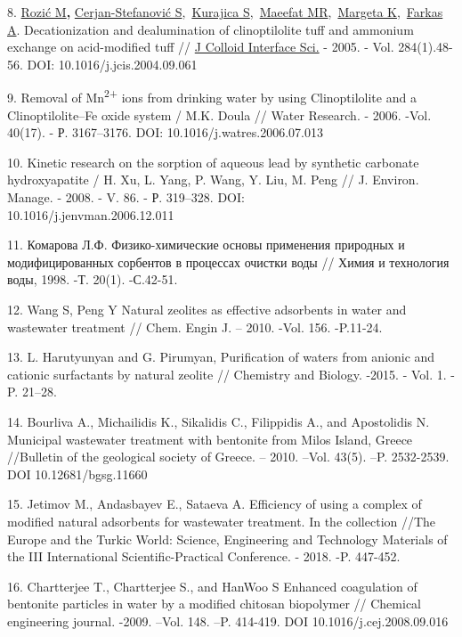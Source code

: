 \begin{references}
8.
\href{https://www.ncbi.nlm.nih.gov/pubmed/?term=Rozi\%C4\%87\%20M\%5BAuthor\%5D&cauthor=true&cauthor_uid=15752783}{Rozić
M}{\bfseries ,}
\href{https://www.ncbi.nlm.nih.gov/pubmed/?term=Cerjan-Stefanovi\%C4\%87\%20S\%5BAuthor\%5D&cauthor=true&cauthor_uid=15752783}{Cerjan-Stefanović
S},~\href{https://www.ncbi.nlm.nih.gov/pubmed/?term=Kurajica\%20S\%5BAuthor\%5D&cauthor=true&cauthor_uid=15752783}{Kurajica
S},~\href{https://www.ncbi.nlm.nih.gov/pubmed/?term=Maeefat\%20MR\%5BAuthor\%5D&cauthor=true&cauthor_uid=15752783}{Maeefat
MR},~\href{https://www.ncbi.nlm.nih.gov/pubmed/?term=Margeta\%20K\%5BAuthor\%5D&cauthor=true&cauthor_uid=15752783}{Margeta
K},~\href{https://www.ncbi.nlm.nih.gov/pubmed/?term=Farkas\%20A\%5BAuthor\%5D&cauthor=true&cauthor_uid=15752783}{Farkas
A}. Decationization and dealumination of clinoptilolite tuff and
ammonium exchange on acid-modified tuff //
\href{https://www.ncbi.nlm.nih.gov/pubmed/15752783}{J Colloid Interface
Sci.} - 2005. - Vol. 284(1).48-56. DOI: 10.1016/j.jcis.2004.09.061

9. Removal of Mn\textsuperscript{2+} ions from drinking water by using
Clinoptilolite and a Clinoptilolite--Fe oxide system / M.K. Doula //
Water Research. - 2006. -Vol. 40(17). - Р. 3167--3176. DOI:
10.1016/j.watres.2006.07.013

10. Kinetic research on the sorption of aqueous lead by synthetic
carbonate hydroxyapatite / H. Xu, L. Yang, P. Wang, Y. Liu, M. Peng //
J. Environ. Manage. - 2008. - V. 86. - Р. 319--328. DOI:
\\10.1016/j.jenvman.2006.12.011

11. Комарова Л.Ф. Физико-химические основы применения природных и
модифицированных сорбентов в процессах очистки воды // Химия и
технология воды, 1998. -Т. 20(1). -С.42-51.

12. Wang S, Peng Y Natural zeolites as effective adsorbents in water and
wastewater treatment // Chem. Engin J. -- 2010. -Vol. 156. -P.11-24.

13. L. Harutyunyan and G. Pirumyan, Purification of waters from anionic
and cationic surfactants by natural zeolite // Chemistry and Biology.
-2015. - Vol. 1. - P. 21--28.

14. Bourliva A., Michailidis K., Sikalidis C., Filippidis A., and
Apostolidis N. Municipal wastewater treatment with bentonite from Milos
Island, Greece //Bulletin of the geological society of Greece. -- 2010.
--Vol. 43(5). --P. 2532-2539. DOI 10.12681/bgsg.11660

15. Jetimov M., Andasbayev E., Sataeva A. Efficiency of using a complex
of modified natural adsorbents for wastewater treatment. In the
collection //The Europe and the Turkic World: Science, Engineering and
Technology Materials of the III International Scientific-Practical
Conference. - 2018. -P. 447-452.

16. Chartterjee T., Chartterjee S., and HanWoo S Enhanced coagulation of
bentonite particles in water by a modified chitosan biopolymer //
Chemical engineering journal. -2009. --Vol. 148. --P. 414-419. DOI
10.1016/j.cej.2008.09.016
\end{references}

